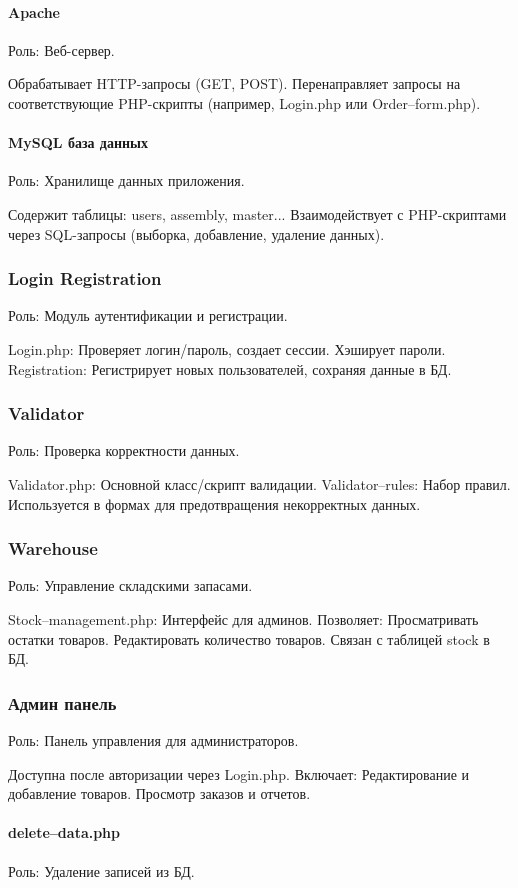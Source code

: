 \paragraph{Apache} 
Роль: Веб-сервер.

Обрабатывает HTTP-запросы (GET, POST).
Перенаправляет запросы на соответствующие PHP-скрипты (например, Login.php или Order--form.php).
\paragraph{MySQL база данных} 
Роль: Хранилище данных приложения.

Содержит таблицы: users, assembly, master...
Взаимодействует с PHP-скриптами через SQL-запросы (выборка, добавление, удаление данных).
\subsubsection{Login Registration}
Роль: Модуль аутентификации и регистрации.

Login.php: Проверяет логин/пароль, создает сессии.
Хэширует пароли.
Registration: Регистрирует новых пользователей, сохраняя данные в БД.
\subsubsection{Validator}
Роль: Проверка корректности данных.

Validator.php: Основной класс/скрипт валидации.
Validator--rules: Набор правил.
Используется в формах для предотвращения некорректных данных.
\subsubsection{Warehouse}
Роль: Управление складскими запасами.

Stock--management.php: Интерфейс для админов. Позволяет:
Просматривать остатки товаров.
Редактировать количество товаров.
Связан с таблицей stock в БД.
\subsubsection{Админ панель}
Роль: Панель управления для администраторов.

Доступна после авторизации через Login.php.
Включает:
Редактирование и добавление товаров.
Просмотр заказов и отчетов.
\paragraph{delete--data.php}
Роль: Удаление записей из БД.

